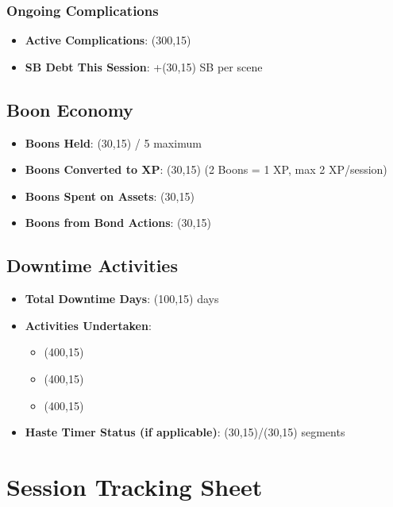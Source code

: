 \documentclass[11pt,letterpaper]{article}
\begin{document}
\subsubsection{Ongoing Complications}
\begin{itemize}
    \item \textbf{Active Complications}: \framebox(300,15){}
    \item \textbf{SB Debt This Session}: +\framebox(30,15){} SB per scene
\end{itemize}

\subsection{Boon Economy}

\begin{itemize}
    \item \textbf{Boons Held}: \framebox(30,15){} / 5 maximum
    \item \textbf{Boons Converted to XP}: \framebox(30,15){} (2 Boons = 1 XP, max 2 XP/session)
    \item \textbf{Boons Spent on Assets}: \framebox(30,15){}
    \item \textbf{Boons from Bond Actions}: \framebox(30,15){}
\end{itemize}

\subsection{Downtime Activities}

\begin{itemize}
    \item \textbf{Total Downtime Days}: \framebox(100,15){} days
    \item \textbf{Activities Undertaken}: 
    \begin{itemize}
        \item \framebox(400,15){}
        \item \framebox(400,15){}
        \item \framebox(400,15){}
    \end{itemize}
    \item \textbf{Haste Timer Status (if applicable)}: \framebox(30,15){}/\framebox(30,15){} segments
\end{itemize}

\newpage

\section{Session Tracking Sheet}
\end{document}
